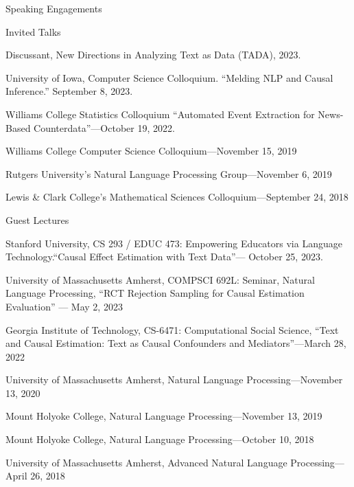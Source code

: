 \documentclass{resume} %
\begin{document}
\begin{rSection}{Speaking Engagements}

\begin{rSubsection}{Invited Talks}{}{}{}
\item Discussant, New Directions in Analyzing Text as Data (TADA), 2023.
\item University of Iowa, Computer Science Colloquium. ``Melding NLP and Causal Inference.'' September 8, 2023. 
\item Williams College Statistics Colloquium ``Automated Event Extraction for
News-Based Counterdata''---October 19, 2022.
\item Williams College Computer Science Colloquium---November 15, 2019
\item Rutgers University's Natural Language Processing Group---November 6, 2019
\item Lewis \& Clark College's Mathematical Sciences Colloquium---September 24, 2018
\end{rSubsection}

\begin{rSubsection}{Guest Lectures}{}{}{}
\item Stanford University, CS 293 / EDUC 473: Empowering Educators via Language Technology.``Causal Effect Estimation with Text Data''--- October 25, 2023. 
\item University of Massachusetts Amherst, COMPSCI 692L: Seminar, Natural Language Processing, ``RCT Rejection Sampling for Causal Estimation Evaluation'' --- May 2, 2023
\item Georgia Institute of Technology, CS-6471: Computational Social Science, ``Text and Causal Estimation: Text as Causal Confounders and Mediators''---March 28, 2022
\item University of Massachusetts Amherst, Natural Language Processing---November 13, 2020 
\item Mount Holyoke College, Natural Language Processing---November 13, 2019
\item Mount Holyoke College, Natural Language Processing---October 10, 2018
\item University of Massachusetts Amherst, Advanced Natural Language Processing---April 26, 2018
\end{rSubsection}

\end{rSection}
\end{document}
